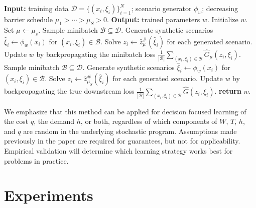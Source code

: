 \documentclass{article}
\newcommand{\1}{\mathbf{1}}
\theoremstyle{plain}
\theoremstyle{definition}
\theoremstyle{remark}
\begin{document}
\begin{algorithm}[H]
\caption{Neural Net Interior Point Method for scenario generation.}
\label{alg:nnipm-training}
\begin{algorithmic}[1]
\Statex \textbf{Input:} training data $\mathcal D=\{(x_i,\xi_i)\}_{i=1}^N$; scenario generator $\phi_w$; decreasing barrier schedule $\mu_1>\cdots>\mu_S>0$.
\Statex \textbf{Output:} trained parameters $w$.
\State Initialize $w$.
    \State Set $\mu\gets\mu_s$.
        \State Sample minibatch $\mathcal B\subseteq\mathcal D$.
        \State Generate synthetic scenarios $\hat\xi_i\gets\phi_w(x_i)$ for $(x_i,\xi_i)\in\mathcal B$.
        \State Solve $z_i\gets\hat z_\mu^\#(\hat\xi_i)$ for each generated scenario.
        \State Update $w$ by backpropagating the minibatch loss $\frac1{|\mathcal B|}\sum_{(x_i,\xi_i)\in\mathcal B}\hat G_\mu(z_i,\xi_i)$.
    \EndFor
\EndFor
{}
    \State Sample minibatch $\mathcal B\subseteq\mathcal D$.
    \State Generate synthetic scenarios $\hat\xi_i\gets\phi_w(x_i)$ for $(x_i,\xi_i)\in\mathcal B$.
    \State Solve $z_i\gets\hat z_{\mu_S}^\#(\hat\xi_i)$ for each generated scenario.
    \State Update $w$ by backpropagating the true downstream loss $\frac1{|\mathcal B|}\sum_{(x_i,\xi_i)\in\mathcal B}\hat G(z_i,\xi_i)$.
\EndFor
\State \textbf{return} $w$.
\end{algorithmic}
\end{algorithm}

We emphasize that this method can be applied for decision focused learning of the cost $q$, the demand $h$, or both, regardless of which components of $W$, $T$, $h$, and $q$ are random in the underlying stochastic program. Assumptions made previously in the paper are required for guarantees, but not for applicability. Empirical validation will determine which learning strategy works best for problems in practice.


\section{Experiments}
\label{sec:experiments}
\end{document}
